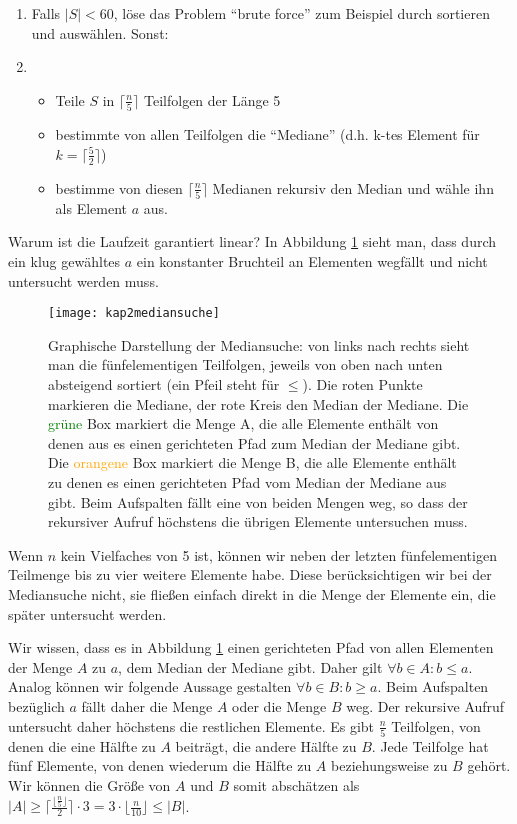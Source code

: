 \begin{enumerate}
  \item Falls $|S| < 60$, löse das Problem "`brute force"' zum Beispiel durch sortieren und auswählen. Sonst:
  \item \begin{itemize}
    \item Teile $S$ in $\lceil \frac{n}{5} \rceil$ Teilfolgen der Länge 5
    \item bestimmte von allen Teilfolgen die "`Mediane"' (d.h. k-tes Element für $k=\lceil \frac{5}{2} \rceil$)
    \item bestimme von diesen $\lceil \frac{n}{5} \rceil$ Medianen rekursiv den Median und wähle ihn als Element $a$ aus.
  \end{itemize}
\end{enumerate}

Warum ist die Laufzeit garantiert linear? In Abbildung \ref{mediansuche} sieht man, dass durch ein klug gewähltes $a$ ein konstanter Bruchteil an Elementen wegfällt und nicht untersucht werden muss.

\begin{figure}[htb]
  \texttt{[image: kap2mediansuche]}
  \centering
  \caption{Graphische Darstellung der Mediansuche: von links nach rechts sieht man die fünf\-ele\-men\-ti\-gen Teilfolgen, jeweils von oben nach unten absteigend sortiert (ein Pfeil steht für $\le$). Die roten Punkte markieren die Mediane, der rote Kreis den Median der Mediane. Die \textcolor{green}{grüne} Box markiert die Menge A, die alle Elemente enthält von denen aus es einen gerichteten Pfad zum Median der Mediane gibt. Die \textcolor{orange}{orangene} Box markiert die Menge B, die alle Elemente enthält zu denen es einen gerichteten Pfad vom Median der Mediane aus gibt. Beim Aufspalten fällt eine von beiden Mengen weg, so dass der rekursiver Aufruf höchstens die übrigen Elemente untersuchen muss.}
  \label{mediansuche}
\end{figure}

Wenn $n$ kein Vielfaches von 5 ist, können wir neben der letzten fünfelementigen Teilmenge bis zu vier weitere Elemente habe. Diese berücksichtigen wir bei der Mediansuche nicht, sie fließen einfach direkt in die Menge der Elemente ein, die später untersucht werden.

Wir wissen, dass es in Abbildung \ref{mediansuche} einen gerichteten Pfad von allen Elementen der Menge $A$ zu $a$, dem Median der Mediane gibt. Daher gilt $\forall b \in A : b \le a$. Analog können wir folgende Aussage gestalten $\forall b \in B : b \ge a$. Beim Aufspalten bezüglich $a$ fällt daher die Menge $A$ oder die Menge $B$ weg. Der rekursive Aufruf untersucht daher höchstens die restlichen Elemente. Es gibt $\frac{n}{5}$ Teilfolgen, von denen die eine Hälfte zu $A$ beiträgt, die andere Hälfte zu $B$. Jede Teilfolge hat fünf Elemente, von denen wiederum die Hälfte zu $A$ beziehungsweise zu $B$ gehört. Wir können die Größe von $A$ und $B$ somit abschätzen als $|A| \ge \lceil\frac{\lfloor\frac{n}{5}\rfloor}{2} \rceil \cdot 3 = 3 \cdot \lfloor \frac{n}{10} \rfloor \le |B|$.

